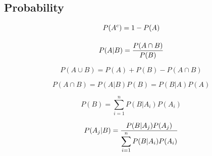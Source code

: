 \subsection{Probability}%
\label{sub:probability}

\begin{multicols}{2}

    \begin{CheatsheetEntryFrame}

        \begin{gather*}
            P(A^c) = 1 - P(A)
            \\[\abovedisplayskip]
            P(A|B) = \frac{P(A \cap B)}{P(B)}
        \end{gather*}

        \begin{equation*}
            P(A \cup B) = P(A) + P(B) - P(A \cap B)
        \end{equation*}

        \begin{equation*}
            P(A \cap B) = P(A|B) P(B) = P(B|A) P(A)
        \end{equation*}

        \begin{equation*}
            P(B) = \sum_{i=1}^n{P(B|A_i) P(A_i)}
        \end{equation*}

        \begin{equation*}
            P(A_j|B) = \displaystyle \frac{\displaystyle {P(B|A_j) P(A_j)}}{\displaystyle {\sum_{i=1}^n{P(B|A_i) P(A_i)}}}
        \end{equation*}

    \end{CheatsheetEntryFrame}
    
\end{multicols}

